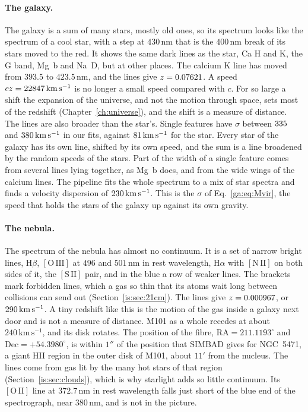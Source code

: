 \paragraph{The galaxy.} The galaxy is a sum of many stars, mostly old ones, so its spectrum looks like the spectrum of a cool star, with a step at $430\,\mathrm{nm}$ that is the $400\,\mathrm{nm}$ break of its stars moved to the red. It shows the same dark lines as the star, Ca H and K, the G band, Mg~b and Na~D, but at other places. The calcium K line has moved from $393.5$ to $423.5\,\mathrm{nm}$, and the lines give $z=0.07621$. A speed $cz=22847\,\mathrm{km\,s^{-1}}$ is no longer a small speed compared with $c$. For so large a shift the expansion of the universe, and not the motion through space, sets most of the redshift (Chapter~\ref{ch:universe}), and the shift is a measure of distance. The lines are also broader than the star's. Single features have $\sigma$ between $335$ and $380\,\mathrm{km\,s^{-1}}$ in our fits, against $81\,\mathrm{km\,s^{-1}}$ for the star. Every star of the galaxy has its own line, shifted by its own speed, and the sum is a line broadened by the random speeds of the stars. Part of the width of a single feature comes from several lines lying together, as Mg~b does, and from the wide wings of the calcium lines. The pipeline fits the whole spectrum to a mix of star spectra and finds a velocity dispersion of $230\,\mathrm{km\,s^{-1}}$. This is the $\sigma$ of Eq.~\eqref{ga:eq:Mvir}, the speed that holds the stars of the galaxy up against its own gravity.

\paragraph{The nebula.} The spectrum of the nebula has almost no continuum. It is a set of narrow bright lines, $\mathrm H\beta$, $\mathrm{[O\,III]}$ at $496$ and $501\,\mathrm{nm}$ in rest wavelength, $\mathrm H\alpha$ with $\mathrm{[N\,II]}$ on both sides of it, the $\mathrm{[S\,II]}$ pair, and in the blue a row of weaker lines. The brackets mark forbidden lines, which a gas so thin that its atoms wait long between collisions can send out (Section~\ref{is:sec:21cm}). The lines give $z=0.000967$, or $290\,\mathrm{km\,s^{-1}}$. A tiny redshift like this is the motion of the gas inside a galaxy next door and is not a measure of distance. M101 as a whole recedes at about $240\,\mathrm{km\,s^{-1}}$, and its disk rotates. The position of the fibre, $\mathrm{RA}=211.1193^\circ$ and $\mathrm{Dec}=+54.3980^\circ$, is within $1''$ of the position that SIMBAD gives for NGC~5471, a giant HII region in the outer disk of M101, about $11'$ from the nucleus. The lines come from gas lit by the many hot stars of that region (Section~\ref{is:sec:clouds}), which is why starlight adds so little continuum. Its $\mathrm{[O\,II]}$ line at $372.7\,\mathrm{nm}$ in rest wavelength falls just short of the blue end of the spectrograph, near $380\,\mathrm{nm}$, and is not in the picture.

